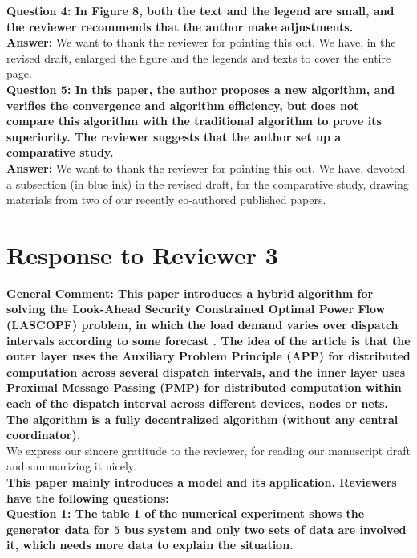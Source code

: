 \documentclass[8pt]{article}
\begin{document}
\textbf{Question 4: In Figure 8, both the text and the legend are small, and the reviewer recommends that the author make adjustments.}\\

\textbf{Answer: } We want to thank the reviewer for pointing this out. We have, in the revised draft, enlarged the figure and the legends and texts to cover the entire page.\\
 
\textbf{Question 5: In this paper, the author proposes a new algorithm, and verifies the convergence and algorithm efficiency, but does not compare this algorithm with the traditional algorithm to prove its superiority. The reviewer suggests that the author set up a comparative study.}\\

\textbf{Answer: } We want to thank the reviewer for pointing this out. We have, devoted a subsection (in blue ink) in the revised draft, for the comparative study, drawing materials from two of our recently co-authored published papers.\\

\section{Response to Reviewer 3}

\noindent\textbf{General Comment: This paper introduces a hybrid algorithm for solving the Look-Ahead Security Constrained Optimal Power Flow (LASCOPF) problem, in which the load demand varies over dispatch intervals according to some forecast . The idea of the article is that the outer layer uses the Auxiliary Problem Principle (APP) for distributed computation across several dispatch intervals, and the inner layer uses Proximal Message Passing (PMP) for distributed computation within each of the dispatch interval across different devices, nodes or nets. The algorithm is a fully decentralized algorithm (without any central coordinator).}\\

We express our sincere gratitude to the reviewer, for reading our manuscript draft and summarizing it nicely. \\

\textbf{This paper mainly introduces a model and its application. Reviewers have the following questions:}\\

\textbf{Question 1: The table 1 of the numerical experiment shows the generator data for 5 bus system and only two sets of data are involved it, which needs more data to explain the situation.}\\
\end{document}
